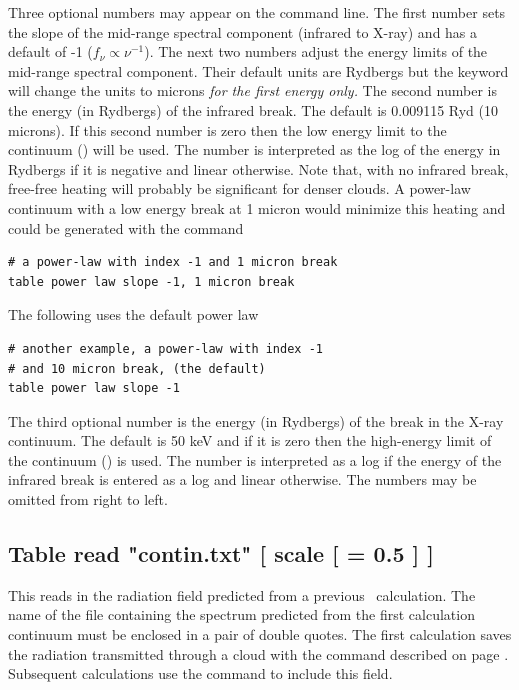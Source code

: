 Three optional numbers may appear on the command line.
The first number
sets the slope of the mid-range spectral component (infrared to X-ray)
and has a default of -1 ($f_\nu   \propto \nu ^{ - 1} $).
The
next two numbers adjust the energy limits of the mid-range spectral
component.
Their default units are Rydbergs but the keyword  will
change the units to microns \emph{for the first energy only.}
The second number
is the energy (in Rydbergs) of the infrared break.
The default is 0.009115
Ryd (10 microns).
If this second number is zero then the low energy limit
to the continuum (\emm ) will be used.
The number is interpreted
as the log of the energy in Rydbergs if it is negative and linear otherwise.
Note that, with no infrared break, free-free heating will probably be
significant for denser clouds.  A power-law continuum with a low energy
break at 1 micron would minimize this heating and could be generated with
the command
\begin{verbatim}
# a power-law with index -1 and 1 micron break
table power law slope -1, 1 micron break
\end{verbatim}
The following uses the default power law
\begin{verbatim}
# another example, a power-law with index -1
# and 10 micron break, (the default)
table power law slope -1
\end{verbatim}

The third optional number is the energy (in Rydbergs) of the break in
the X-ray continuum.
The default is 50 keV and if it is zero then the
high-energy limit of the continuum (\egamry ) is used.
The number is interpreted as a log if the energy of the
infrared break is entered as
a log and linear otherwise.
The numbers may be omitted from right to left.

\subsection{Table read "contin.txt" [ scale [ = 0.5 ] ]}
\label{sec:CommandTableRead}

This reads in the radiation field predicted from
a previous \Cloudy\ calculation.
The name of the file containing the spectrum predicted
from the first calculation continuum must be enclosed
in a pair of double quotes.
The first calculation saves the radiation
transmitted through a cloud with the
 command described on page
\pageref{sec:CommandSaveTransmittedContinuum}.
Subsequent calculations use the  command
to include this field.

